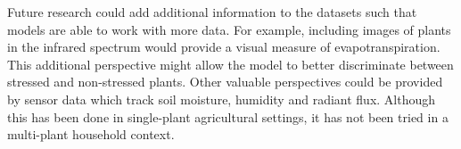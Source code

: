 \documentclass[final]{vutinfth} %
\begin{document}
Future research could add additional information to the datasets such
that models are able to work with more data. For example, including
images of plants in the infrared spectrum would provide a visual
measure of evapotranspiration. This additional perspective might allow
the model to better discriminate between stressed and non-stressed
plants. Other valuable perspectives could be provided by sensor data
which track soil moisture, humidity and radiant flux. Although this
has been done in single-plant agricultural settings, it has not been
tried in a multi-plant household context.

\backmatter

\listoffigures %

\cleardoublepage %
\listoftables %


\printindex

\printglossaries

%
\printbibliography
\end{document}
